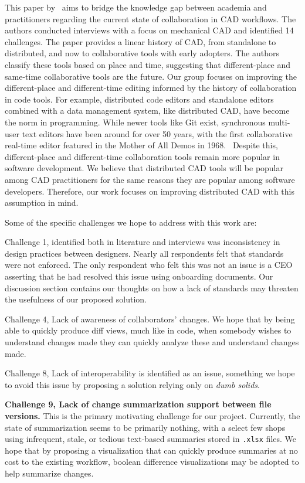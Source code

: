 \documentclass[sigconf,authorversion,nonacm]{acmart}
\begin{document}
This paper by~\citet{cheng2023age} aims to bridge the knowledge gap between academia and practitioners regarding the current state of collaboration in CAD workflows.
The authors conducted interviews with a focus on mechanical CAD and identified 14 challenges. The paper provides a linear history of CAD, from standalone to distributed, and now to collaborative tools with early adopters.
The authors classify these tools based on place and time, suggesting that different-place and same-time collaborative tools are the future.
Our group focuses on improving the different-place and different-time editing informed by the history of collaboration in code tools.
For example, distributed code editors and standalone editors combined with a data management system, like distributed CAD, have become the norm in programming.
While newer tools like Git exist, synchronous multi-user text editors have been around for over 50 years, with the first collaborative real-time editor featured in the Mother of All Demos in 1968.~\cite{motherofalldemos}
Despite this, different-place and different-time collaboration tools remain more popular in software development.
We believe that distributed CAD tools will be popular among CAD practitioners for the same reasons they are popular among software developers. Therefore, our work focuses on improving distributed CAD with this assumption in mind.

Some of the specific challenges we hope to address with this work are:

Challenge 1, identified both in literature and interviews was inconsistency in design practices between designers.
Nearly all respondents felt that standards were not enforced.
The only respondent who felt this was not an issue is a CEO asserting that he had resolved this issue using onboarding documents.
Our discussion section contains our thoughts on how a lack of standards may threaten the usefulness of our proposed solution.

Challenge 4, Lack of awareness of collaborators' changes.
We hope that by being able to quickly produce diff views, much like in code, when somebody wishes to understand changes made they can quickly analyze these and understand changes made.

Challenge 8, Lack of interoperability is identified as an issue, something we hope to avoid this issue by proposing a solution relying only on \emph{dumb solids}.

\textbf{Challenge 9, Lack of change summarization support between file versions.}
This is the primary motivating challenge for our project.
Currently, the state of summarization seems to be primarily nothing, with a select few shops using infrequent, stale, or tedious text-based summaries stored in \texttt{.xlsx} files.
We hope that by proposing a visualization that can quickly produce summaries at no cost to the existing workflow, boolean difference visualizations may be adopted to help summarize changes.
\end{document}
